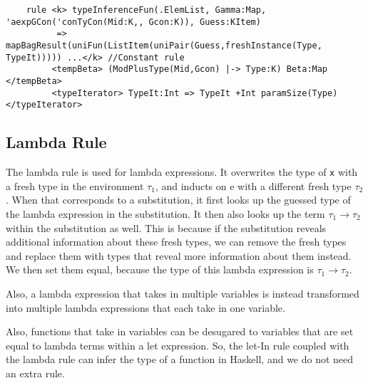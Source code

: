 \begin{lstlisting}
    rule <k> typeInferenceFun(.ElemList, Gamma:Map, 'aexpGCon('conTyCon(Mid:K,, Gcon:K)), Guess:KItem)
          => mapBagResult(uniFun(ListItem(uniPair(Guess,freshInstance(Type, TypeIt))))) ...</k> //Constant rule
         <tempBeta> (ModPlusType(Mid,Gcon) |-> Type:K) Beta:Map </tempBeta>
         <typeIterator> TypeIt:Int => TypeIt +Int paramSize(Type) </typeIterator>
\end{lstlisting}

\subsection{Lambda Rule}

The lambda rule is used for lambda expressions. It overwrites the type of \texttt{x} with a fresh type in the environment \texttt{$\tau_1$}, and inducts on e with a different fresh type \texttt{$\tau_2$}. When that corresponds to a substitution, it first looks up the guessed type of the lambda expression in the substitution. It then also looks up the term \texttt{$\tau_1 \rightarrow \tau_2$} within the substitution as well. This is because if the substitution reveals additional information about these fresh types, we can remove the fresh types and replace them with types that reveal more information about them instead. We then set them equal, because the type of this lambda expression is \texttt{$\tau_1 \rightarrow \tau_2$}.

Also, a lambda expression that takes in multiple variables is instead transformed into multiple lambda expressions that each take in one variable.

Also, functions that take in variables can be desugared to variables that are set equal to lambda terms within a let expression. So, the let-In rule coupled with the lambda rule can infer the type of a function in Haskell, and we do not need an extra rule.

\begin{prooftree}
\end{prooftree}

